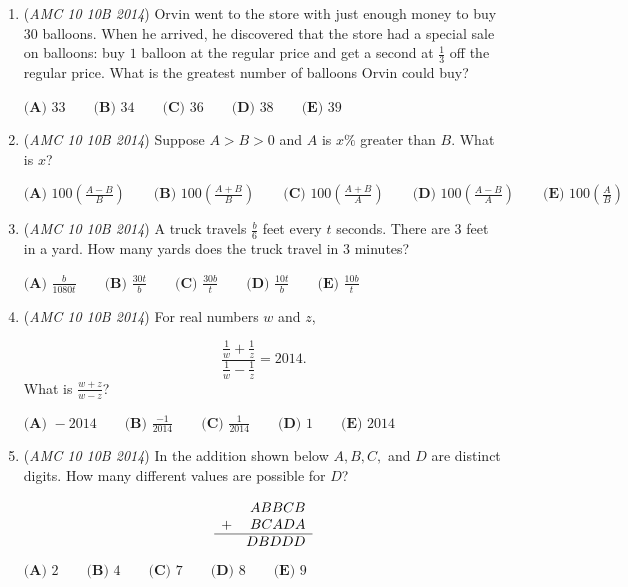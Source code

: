 \begin{enumerate}
$\textbf{(A)}\ 26\qquad\textbf{(B)}\ 28\qquad\textbf{(C)}\ 30\qquad\textbf{(D)}\ 32\qquad\textbf{(E)}\ 34$


	\item (\textit{AMC 10 10B 2014}) Orvin went to the store with just enough money to buy $30$ balloons. When he arrived, he discovered that the store had a special sale on balloons: buy $1$ balloon at the regular price and get a second at $\frac{1}{3}$ off the regular price. What is the greatest number of balloons Orvin could buy?


 $\textbf {(A) } 33 \qquad \textbf {(B) } 34 \qquad \textbf {(C) } 36 \qquad \textbf {(D) } 38 \qquad \textbf {(E) } 39$


	\item (\textit{AMC 10 10B 2014}) Suppose $A>B>0$ and $A$ is $x\%$ greater than $B$. What is $x$?


 $\textbf {(A) } 100\left(\frac{A-B}{B}\right) \qquad \textbf {(B) } 100\left(\frac{A+B}{B}\right) \qquad \textbf {(C) } 100\left(\frac{A+B}{A}\right)\qquad \textbf {(D) } 100\left(\frac{A-B}{A}\right) \qquad \textbf {(E) } 100\left(\frac{A}{B}\right)$


	\item (\textit{AMC 10 10B 2014}) A truck travels $\frac{b}{6}$ feet every $t$ seconds. There are $3$ feet in a yard. How many yards does the truck travel in $3$ minutes?


 $\textbf {(A) } \frac{b}{1080t} \qquad \textbf {(B) } \frac{30t}{b} \qquad \textbf {(C) } \frac{30b}{t}\qquad \textbf {(D) } \frac{10t}{b} \qquad \textbf {(E) } \frac{10b}{t}$


	\item (\textit{AMC 10 10B 2014}) For real numbers $w$ and $z$, 

 \[\frac{\frac{1}{w} + \frac{1}{z}}{\frac{1}{w} - \frac{1}{z}} = 2014.\]
What is $\frac{w+z}{w-z}$?


 $\textbf{(A) } -2014 \qquad\textbf{(B) } \frac{-1}{2014} \qquad\textbf{(C) } \frac{1}{2014} \qquad\textbf{(D) } 1 \qquad\textbf{(E) } 2014$


	\item (\textit{AMC 10 10B 2014}) In the addition shown below $A, B, C,$ and $D$ are distinct digits. How many different values are possible for $D$?


 
 \[\begin{array}{lr}&ABBCB\\ +& BCADA\\ \hline & DBDDD\end{array}\]
$\textbf{(A) }2\qquad\textbf{(B) }4\qquad\textbf{(C) }7\qquad\textbf{(D) }8\qquad\textbf{(E) }9$



\end{enumerate}
